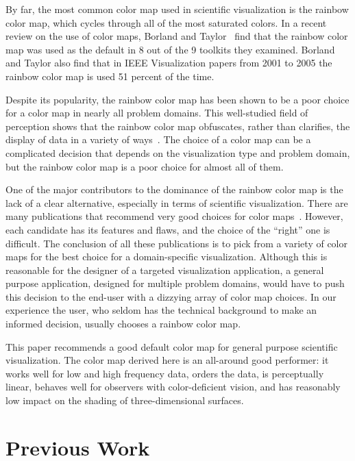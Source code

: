 \documentclass{llncs}
\begin{document}
By far, the most common color map used in scientific visualization is the
rainbow color map, which cycles through all of the most
saturated colors.  In a recent review on the use of color maps, Borland and
Taylor~\cite{Borland07} find that the rainbow color map was used as the
default in 8 out of the 9 toolkits they examined.  Borland and Taylor also
find that in IEEE Visualization papers from 2001 to 2005 the rainbow color
map is used 51 percent of the time.

Despite its popularity, the rainbow color map has been shown to be a poor
choice for a color map in nearly all problem domains.  This well-studied
field of perception shows that the rainbow color map obfuscates, rather
than clarifies, the display of data in a variety of ways~\cite{Borland07}.
The choice of a color map can be a complicated decision that depends on the
visualization type and problem domain, but the rainbow color map is a poor
choice for almost all of them.

One of the major contributors to the dominance of the rainbow color map is the
lack of a clear alternative, especially in terms of scientific
visualization.  There are many publications that recommend
very good choices for color maps~\cite{Brewer05,Levkowitz92,Rheingans99,Ware04}.
However, each candidate has its features and flaws, and the choice of
the ``right'' one is difficult.  The conclusion of
all these publications is to pick from a variety of color maps for the best
choice for a domain-specific visualization.  Although this is reasonable
for the designer of a targeted visualization application, a general
purpose application, designed for multiple problem domains, would have to
push this decision to the end-user with a dizzying array of color map
choices.  In our experience the user, who seldom has the technical
background to make an informed decision, usually chooses a rainbow color map.

This paper recommends a good default
color map for general purpose scientific visualization.  The
color map derived here is an all-around good performer: it works well for
low and high frequency data, orders the data, is perceptually linear,
behaves well for observers with color-deficient vision, and has reasonably
low impact on the shading of three-dimensional surfaces.


\section{Previous Work}
\label{sec:PreviousWork}
\end{document}
